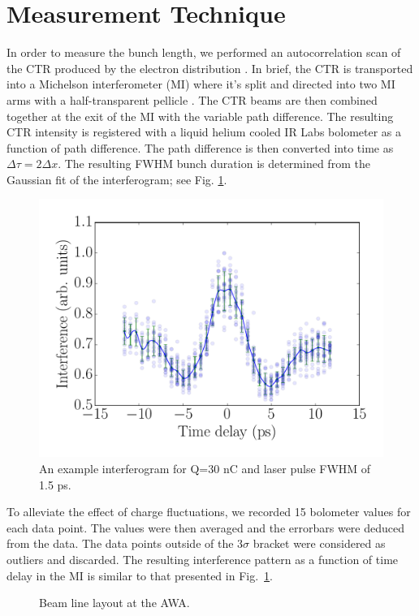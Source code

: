 \documentclass[letterpaper,  %
              ]{jacow-2_3}   %
\begin{document}
\section{Measurement Technique}
In order to measure the bunch length, we performed an autocorrelation scan
of the CTR produced by the electron distribution \cite{Happek, WBarry}.
In brief, the CTR is transported into a Michelson interferometer (MI)
where it's split and directed into two MI arms with a half-transparent pellicle \cite{PhysRevSTAB.9.082801}. 
The CTR beams are then combined together at the exit of the MI with the variable path difference.
The resulting CTR intensity is registered with a liquid helium cooled IR Labs
bolometer \cite{IRlabs} as a function of path difference.
The path difference is then converted into time as $\Delta \tau = 2 \Delta x$.
The resulting FWHM bunch duration is determined from the Gaussian fit of 
the interferogram; see Fig. \ref{interferogram}.
\begin{figure}
 \includegraphics[width=1.0\linewidth]{images/THPMF048f1}
 \caption{An example interferogram for Q=30 nC and laser pulse FWHM of 1.5 ps.}
 \label{interferogram}
\end{figure}
To alleviate the effect of charge fluctuations, we recorded 15 bolometer values for each data point.
The values were then averaged and the errorbars were deduced from the data. The data points
outside of the 3$\sigma$ bracket were considered as outliers and discarded. The resulting
interference pattern as a function of time delay in the MI is similar to that presented in Fig.~\ref{interferogram}.

\begin{figure}[hbt]
	\centering
	\begin{tikzpicture}[scale=0.8, text=black]
	
	\end{tikzpicture}	
	\caption{Beam line layout at the AWA.}
	\label{beamline}
\end{figure}
\end{document}
